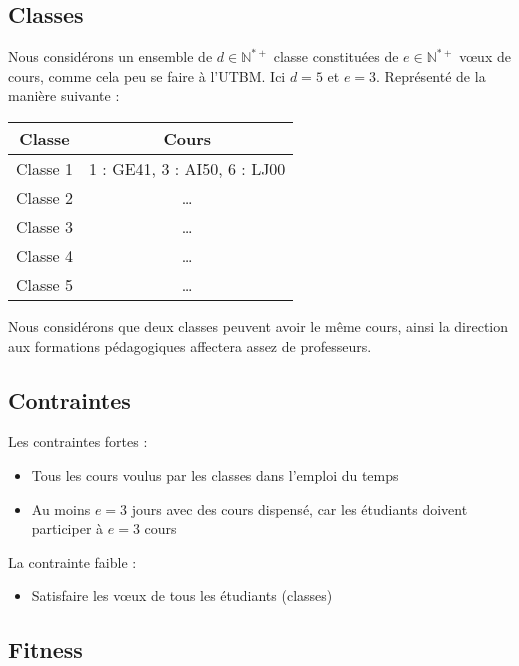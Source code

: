 \subsection{Classes}

Nous considérons un ensemble de $d \in \mathbb{N}^{*+}$ classe constituées de $e \in \mathbb{N}^{*+}$ v\oe ux de cours, comme cela peu se faire à l'\gls{UTBM}.
Ici $d = 5$ et $e = 3$.
Représenté de la manière suivante :

\begin{center}
    \begin{tabular}{|c|c|}
        \hline
        Classe   & Cours                        \\
        \hline
        Classe 1 & 1 : GE41, 3 : AI50, 6 : LJ00 \\
        \hline
        Classe 2 & \ldots                       \\
        \hline
        Classe 3 & \ldots                       \\
        \hline
        Classe 4 & \ldots                       \\
        \hline
        Classe 5 & \ldots                       \\
        \hline
    \end{tabular}
\end{center}

Nous considérons que deux classes peuvent avoir le même cours, ainsi la direction aux formations pédagogiques affectera assez de professeurs.

\subsection{Contraintes}

Les contraintes fortes :
\begin{itemize}
    \item Tous les cours voulus par les classes dans l'emploi du temps
    \item Au moins $e = 3$ jours avec des cours dispensé, car les étudiants doivent participer à $e = 3$ cours
\end{itemize}

La contrainte faible :
\begin{itemize}
    \item Satisfaire les v\oe ux de tous les étudiants (classes)
\end{itemize}

\subsection{Fitness}

